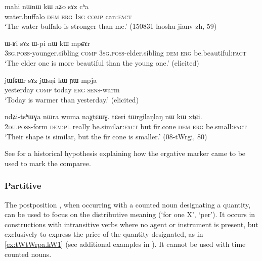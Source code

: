 \begin{exe}
\ex \label{ex:nWnW.kW.aZo.sAz}
 \gll mahi nɯnɯ kɯ aʑo sɤz cʰa \\ 
water.buffalo \textsc{dem} \textsc{erg} \textsc{1sg} \textsc{comp} can:\textsc{fact} \\ 
\glt `The water buffalo is stronger than me.'  (150831 laoshu jianv-zh, 59)
\end{exe}

\begin{exe}
\ex \label{ex:comparative1}
\gll  ɯ-ʁi sɤz ɯ-pi nɯ kɯ mpɕɤr  \\
\textsc{3sg.poss}-younger.sibling \textsc{comp} \textsc{3sg.poss}-elder.sibling \textsc{dem} \textsc{erg} be.beautiful:\textsc{fact} \\
\glt `The elder one is more beautiful than the young one.' (elicited)
\end{exe}
 
\begin{exe}
\ex \label{ex:comparative2}
\gll  jɯfɕɯr sɤz  jɯsŋi kɯ  ɲɯ-mpja \\
yesterday \textsc{comp} today \textsc{erg} \textsc{sens}-warm \\
\glt `Today is warmer than yesterday.' (elicited)
\end{exe}
\begin{exe}
\ex \label{ex:nW.kW.xtCi}
\gll ndʑi-tsʰɯɣa nɯra wuma naχtɕɯɣ. tɕeri tɯrgilaŋlaŋ nɯ kɯ xtɕi. \\
\textsc{2du}.\textsc{poss}-form \textsc{dem}:\textsc{pl} really be.similar:\textsc{fact} but fir.cone \textsc{dem} \textsc{erg} be.small:\textsc{fact} \\
\glt  `Their shape is similar, but the fir cone is smaller.' (08-tWrgi, 80)
\end{exe}

See \citet{jacques16comparative} for a historical hypothesis explaining how the ergative marker came to be used to mark the comparee. 

\subsubsection{Partitive} \label{sec:partitive.kW}
The postposition , when occurring with a counted noun designating a quantity, can be used to focus on the distributive meaning (`for one X', `per'). It occurs in constructions with intransitive verbs where no agent or instrument is present, but exclusively to express the price of the quantity designated, as in  \ref{ex:tWtWrpa.kW1} (see additional examples in \citealt[5-6]{jacques16comparative}). It cannot be used with time counted nouns.

